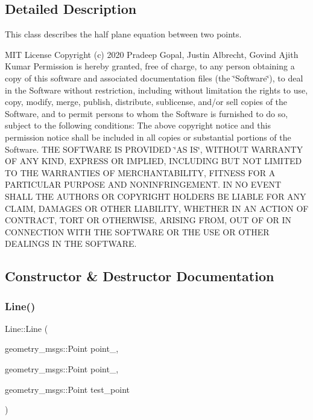 \subsection{Detailed Description}
This class describes the half plane equation between two points. 

M\+IT License Copyright (c) 2020 Pradeep Gopal, Justin Albrecht, Govind Ajith Kumar Permission is hereby granted, free of charge, to any person obtaining a copy of this software and associated documentation files (the \char`\"{}\+Software\char`\"{}), to deal in the Software without restriction, including without limitation the rights to use, copy, modify, merge, publish, distribute, sublicense, and/or sell copies of the Software, and to permit persons to whom the Software is furnished to do so, subject to the following conditions\+: The above copyright notice and this permission notice shall be included in all copies or substantial portions of the Software. T\+HE S\+O\+F\+T\+W\+A\+RE IS P\+R\+O\+V\+I\+D\+ED \char`\"{}\+A\+S I\+S\char`\"{}, W\+I\+T\+H\+O\+UT W\+A\+R\+R\+A\+N\+TY OF A\+NY K\+I\+ND, E\+X\+P\+R\+E\+SS OR I\+M\+P\+L\+I\+ED, I\+N\+C\+L\+U\+D\+I\+NG B\+UT N\+OT L\+I\+M\+I\+T\+ED TO T\+HE W\+A\+R\+R\+A\+N\+T\+I\+ES OF M\+E\+R\+C\+H\+A\+N\+T\+A\+B\+I\+L\+I\+TY, F\+I\+T\+N\+E\+SS F\+OR A P\+A\+R\+T\+I\+C\+U\+L\+AR P\+U\+R\+P\+O\+SE A\+ND N\+O\+N\+I\+N\+F\+R\+I\+N\+G\+E\+M\+E\+NT. IN NO E\+V\+E\+NT S\+H\+A\+LL T\+HE A\+U\+T\+H\+O\+RS OR C\+O\+P\+Y\+R\+I\+G\+HT H\+O\+L\+D\+E\+RS BE L\+I\+A\+B\+LE F\+OR A\+NY C\+L\+A\+IM, D\+A\+M\+A\+G\+ES OR O\+T\+H\+ER L\+I\+A\+B\+I\+L\+I\+TY, W\+H\+E\+T\+H\+ER IN AN A\+C\+T\+I\+ON OF C\+O\+N\+T\+R\+A\+CT, T\+O\+RT OR O\+T\+H\+E\+R\+W\+I\+SE, A\+R\+I\+S\+I\+NG F\+R\+OM, O\+UT OF OR IN C\+O\+N\+N\+E\+C\+T\+I\+ON W\+I\+TH T\+HE S\+O\+F\+T\+W\+A\+RE OR T\+HE U\+SE OR O\+T\+H\+ER D\+E\+A\+L\+I\+N\+GS IN T\+HE S\+O\+F\+T\+W\+A\+RE. 

\subsection{Constructor \& Destructor Documentation}
\mbox{\label{class_line_a289e8402ebf5be14865f91cc684c98dc}} 
\subsubsection{\texorpdfstring{Line()}{Line()}}
{\footnotesize\ttfamily Line\+::\+Line (\begin{DoxyParamCaption}\item[{geometry\+\_\+msgs\+::\+Point}]{point\+\_,  }\item[{geometry\+\_\+msgs\+::\+Point}]{point\+\_,  }\item[{geometry\+\_\+msgs\+::\+Point}]{test\+\_\+point }\end{DoxyParamCaption})}



